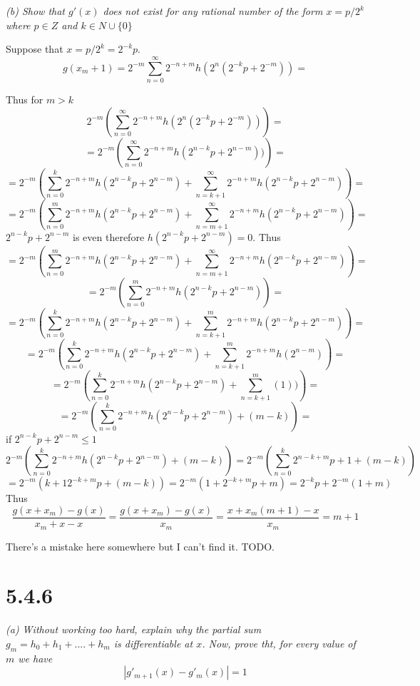 \documentclass[11pt,oneside,titlepage]{book}
\begin{document}
\textit{(b) Show that $g'(x)$ does not exist for any rational number of the
  form $x = p/2^k$ where $p \in Z$ and $k \in N \cup \{0\}$}

Suppose that $x = p/2^k = 2^{-k}p$.
$$g(x_m + 1) =
2^{-m}\sum_{n = 0}^{\infty}{2^{-n + m} h(2^{n}(2^{-k}p + 2^{-m}))} =
$$

Thus for $m > k$
$$
2^{-m}
\left(\sum_{n = 0}^{\infty}{2^{-n + m} h(2^{n}(2^{-k}p + 2^{-m}))}\right) =
$$
$$
= 2^{-m}
\left(\sum_{n = 0}^{\infty}{2^{-n + m} h(2^{n -k}p + 2^{n-m}))}\right) =
$$
$$
= 2^{-m}
\left(\sum_{n = 0}^{k}{2^{-n + m} h(2^{n -k}p + 2^{n-m})} +
  \sum_{n = k + 1}^{\infty}{2^{-n + m} h(2^{n -k}p + 2^{n-m})}\right) =
$$
$$
= 2^{-m}
\left(\sum_{n = 0}^{m}{2^{-n + m} h(2^{n -k}p + 2^{n-m})} +
  \sum_{n = m + 1}^{\infty}{2^{-n + m} h(2^{n -k}p + 2^{n-m})}\right) =
$$
$2^{n -k}p + 2^{n-m}$ is even therefore $h(2^{n -k}p + 2^{n-m}) = 0$.  Thus
$$
= 2^{-m}
\left(\sum_{n = 0}^{m}{2^{-n + m} h(2^{n -k}p + 2^{n-m})} +
  \sum_{n = m + 1}^{\infty}{2^{-n + m} h(2^{n -k}p + 2^{n-m})}\right) =
$$
$$
= 2^{-m}
\left(\sum_{n = 0}^{m}{2^{-n + m} h(2^{n -k}p + 2^{n-m})} \right) =
$$
$$
= 2^{-m}
\left(\sum_{n = 0}^{k}{2^{-n + m} h(2^{n -k}p + 2^{n-m})} +
  \sum_{n = k + 1}^{m}{2^{-n + m} h(2^{n -k}p + 2^{n-m})}
\right) =
$$
$$
= 2^{-m}
\left(\sum_{n = 0}^{k}{2^{-n + m} h(2^{n -k}p + 2^{n-m})} +
  \sum_{n = k + 1}^{m}{2^{-n + m} h(2^{n-m})}
\right) =
$$
$$
= 2^{-m}
\left(\sum_{n = 0}^{k}{2^{-n + m} h(2^{n -k}p + 2^{n-m})} +
  \sum_{n = k + 1}^{m}{(1))}
\right) =
$$
$$
= 2^{-m}
\left(\sum_{n = 0}^{k}{2^{-n + m} h(2^{n -k}p + 2^{n-m})} +
(m - k)
\right)=
$$
if $2^{n -k}p + 2^{n-m} \leq 1$
$$
2^{-m}
\left(\sum_{n = 0}^{k}{2^{-n + m} h(2^{n -k}p + 2^{n-m})} +
(m - k)
\right) = 2^{-m}
\left(\sum_{n = 0}^{k}{2^{n -k + m}p + 1} + (m - k)
\right) 
$$
$$=2^{-m} \left(k + 1 2^{-k + m}p + (m - k) \right)
=2^{-m} \left( 1 + 2^{-k + m}p + m \right)
=2^{-k}p + 2^{-m} ( 1  + m)
$$
Thus
$$\frac{g(x + x_m) - g(x)}{x_m + x - x} = \frac{g(x + x_m) - g(x)}{x_m} =
\frac{x + x_m(m + 1) - x}{x_m} =
m + 1$$

There's a mistake here somewhere but I can't find it. TODO.


\section*{5.4.6}
\textit{(a) Without working too hard, explain why the partial sum
  $g_m = h_0 + h_1 + .... + h_m$ is differentiable at $x$. Now, prove tht,
  for every value of $m$ we have}
$$|g'_{m + 1}(x) - g'_m(x)| = 1$$
\end{document}
